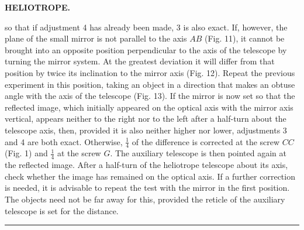 \par\clearpage
\noindent{}\hfill{\small\textbf{HELIOTROPE.}}\hfill\null\par\medskip
\noindent so that if adjustment 4 has already been made, 3 is also exact. If, however, the plane of the small mirror is not parallel to the axis $AB$ (Fig. 11), it cannot be brought into an opposite position perpendicular to the axis of the telescope by turning the mirror system. At the greatest deviation it will differ from that position by twice its inclination to the mirror axis (Fig. 12). Repeat the previous experiment in this position, taking an object in a direction that makes an obtuse angle with the axis of the telescope (Fig. 13). If the mirror is now set so that the reflected image, which initially appeared on the optical axis with the mirror axis vertical, appears neither to the right nor to the left after a half-turn about the telescope axis, then, provided it is also neither higher nor lower, adjustments 3 and 4 are both exact. Otherwise, $\frac14$ of the difference is corrected at the screw $CC$ (Fig. 1) and $\frac14$ at the screw $G$. The auxiliary telescope is then pointed again at the reflected image. After a half-turn of the heliotrope telescope about its axis, check whether the image has remained on the optical axis. If a further correction is needed, it is advisable to repeat the test with the mirror in the first position. The objects need not be far away for this, provided the reticle of the auxiliary telescope is set for the distance.
\par\vspace{2.5cm}\begin{center}\rule{3.5cm}{.4pt}\end{center}

